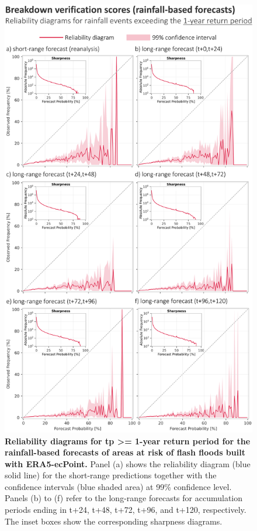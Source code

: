 \begin{figure}[htbp]
\centering
\includegraphics[width=\textwidth]{rainfall_based_ff_verif_breakdown_scores_rel_diag_1rp.png}
\caption{\textbf{Reliability diagrams for tp >= 1-year return period for the rainfall-based forecasts of areas at risk of flash floods built with ERA5-ecPoint.} Panel (a) shows the reliability diagram (blue solid line) for the short-range predictions together with the confidence intervals (blue shaded area) at 99\% confidence level. Panels (b) to (f) refer to the long-range forecasts for accumulation periods ending in t+24, t+48, t+72, t+96, and t+120, respectively. The inset boxes show the corresponding sharpness diagrams.}
\label{fig:rainfall_based_ff_verif_breakdown_scores_rel_diag_1rp}
\end{figure}

